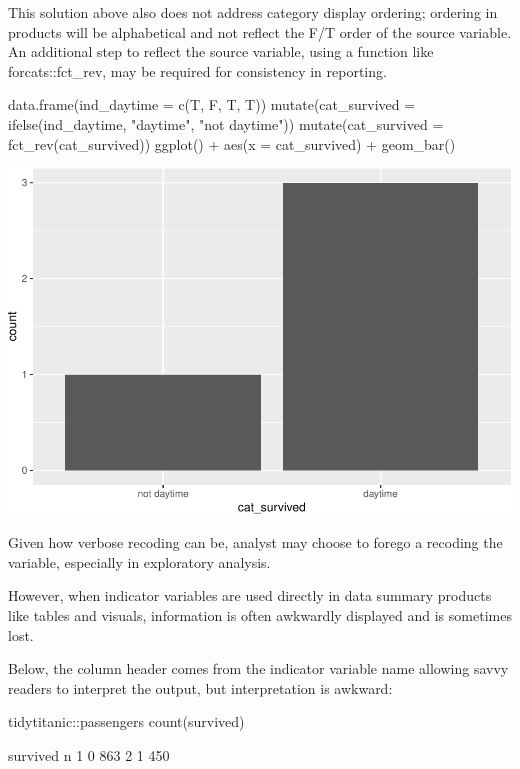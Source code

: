 This solution above also does not address category display ordering;
ordering in products will be alphabetical and not reflect the F/T order
of the source variable. An additional step to reflect the source
variable, using a function like forcats::fct\_rev, may be required for
consistency in reporting.

\begin{Schunk}
\begin{Sinput}
data.frame(ind_daytime = c(T, F, T, T)) %
    mutate(cat_survived = ifelse(ind_daytime, "daytime", "not daytime")) %
  mutate(cat_survived = fct_rev(cat_survived)) %
  ggplot() + 
  aes(x = cat_survived) + 
  geom_bar()
\end{Sinput}

\includegraphics[width=0.69\linewidth]{r_journal_files/figure-latex/unnamed-chunk-4-1} \end{Schunk}

Given how verbose recoding can be, analyst may choose to forego a
recoding the variable, especially in exploratory analysis.

However, when indicator variables are used directly in data summary
products like tables and visuals, information is often awkwardly
displayed and is sometimes lost.

Below, the column header comes from the indicator variable name allowing
savvy readers to interpret the output, but interpretation is awkward:

\begin{Schunk}
\begin{Sinput}
tidytitanic::passengers %
  count(survived) 
\end{Sinput}
\begin{Soutput}
       survived   n
     1        0 863
     2        1 450
\end{Soutput}
\end{Schunk}


